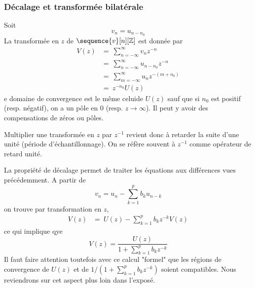 \subsubsection{D\'{e}calage et transform\'{e}e bilat\'{e}rale}
Soit
$$
v_n =u_{n-n_{0}}
$$
La transform\'{e}e en $z$ de $\sequence{v}[n][\zset]$ est donn\'{e}e par
\begin{align*}
V(z) &=\ \sum_{n=-\infty}^{\infty} v_n z^{-n} \\
     &=\ \sum_{n=-\infty}^{\infty}u_{n-n_0}z^{-n} \\
     &=\ \sum_{m=-\infty}^{\infty}u_n z^{-(m+n_{0})} \\
     &=\ z^{-n_{0}} U(z)
\end{align*}
e domaine de convergence est le m\^{e}me celuide $U(z)$ sauf que si $n_{0}$ est positif (resp. n\'{e}gatif), on a un p\^{o}le en $0$ (resp. $ z\rightarrow\infty$). Il peut y avoir des compensations de z\'{e}ros ou p\^{o}les.

Multiplier une transform\'{e}e en $z$ par $z^{-1}$ revient donc \`{a} retarder la suite d'une unit\'{e} (p\'{e}riode d'\'{e}chantillonnage). On se r\'{e}f\`{e}re souvent \`{a} $z^{-1}$ comme op\'{e}rateur de retard unit\'{e}.

La propri\'{e}t\'{e} de d\'{e}calage permet de traiter les \'{e}quations aux diff\'{e}rences vues pr\'{e}c\'{e}demment. A partir de
$$
v_n = u_n - \sum_{k=1}^p b_k u_{n-k}
$$
on trouve par transformation en $z$,
\begin{align*}
V(z) &=\ U(z)- \sum_{k=1}^p b_{k}z^{-k}V(z)
\end{align*}
ce qui implique qye
\[
V(z) =\frac{U(z)}{1+ \sum_{k=1}^p b_{k}z^{-k}}
\]
Il faut faire attention toutefois avec ce calcul "formel" que les régions de convergence de $U(z)$ et de $1/ (1 + \sum_{k=1}^p b_k z^{-k})$ soient compatibles. Nous reviendrons sur cet aspect plus loin dans l'exposé.
